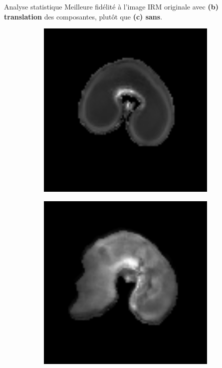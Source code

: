\documentclass[10pt]{beamer}
\begin{document}
\begin{frame}{Analyse statistique}
  Meilleure fidélité à l'image IRM originale avec \textbf{(b)}
  \textbf{translation} des composantes, plutôt que \textbf{(c) sans}.
    \begin{figure}[ht]
  \centering
  \begin{subfigure}[t]{0.3\textwidth}
    \centering
    \includegraphics[width=0.95\textwidth]{fig/t2_6_original}
    \caption{}
    \label{subfig:t2_6_original}
  \end{subfigure}%
  \begin{subfigure}[t]{0.3\textwidth}
    \centering
    \includegraphics[width=0.95\textwidth]{fig/reconstruction_t2_translated.png}

\end{subfigure}
\end{figure}
\end{frame}
\end{document}
